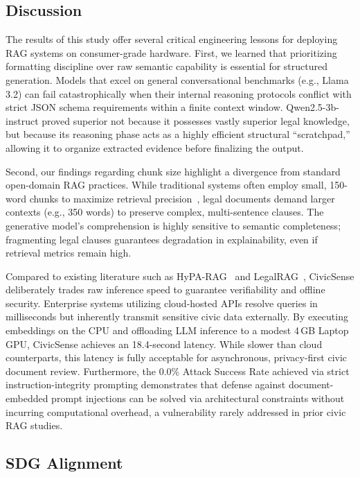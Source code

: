 \documentclass[conference]{IEEEtran}
\begin{document}
\subsection{Discussion}
\label{sec:discussion}

The results of this study offer several critical engineering lessons for deploying RAG systems on consumer-grade hardware. First, we learned that prioritizing formatting discipline over raw semantic capability is essential for structured generation. Models that excel on general conversational benchmarks (e.g., Llama 3.2) can fail catastrophically when their internal reasoning protocols conflict with strict JSON schema requirements within a finite context window. Qwen2.5-3b-instruct proved superior not because it possesses vastly superior legal knowledge, but because its reasoning phase acts as a highly efficient structural ``scratchpad,'' allowing it to organize extracted evidence before finalizing the output.

Second, our findings regarding chunk size highlight a divergence from standard open-domain RAG practices. While traditional systems often employ small, 150-word chunks to maximize retrieval precision~\cite{b1,b2}, legal documents demand larger contexts (e.g., 350 words) to preserve complex, multi-sentence clauses. The generative model's comprehension is highly sensitive to semantic completeness; fragmenting legal clauses guarantees degradation in explainability, even if retrieval metrics remain high.

Compared to existing literature such as HyPA-RAG~\cite{b3} and LegalRAG~\cite{b10}, CivicSense deliberately trades raw inference speed to guarantee verifiability and offline security. Enterprise systems utilizing cloud-hosted APIs resolve queries in milliseconds but inherently transmit sensitive civic data externally. By executing embeddings on the CPU and offloading LLM inference to a modest 4\,GB Laptop GPU, CivicSense achieves an 18.4-second latency. While slower than cloud counterparts, this latency is fully acceptable for asynchronous, privacy-first civic document review. Furthermore, the 0.0\% Attack Success Rate achieved via strict instruction-integrity prompting demonstrates that defense against document-embedded prompt injections can be solved via architectural constraints without incurring computational overhead, a vulnerability rarely addressed in prior civic RAG studies.

\subsection{SDG Alignment}
\end{document}
